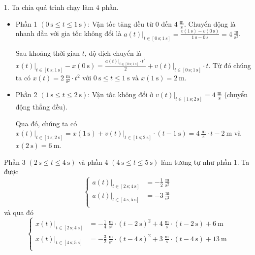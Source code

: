 \documentclass[a4paper, titlepage, openany]{book}
\newcounter{solution}
\numberwithin{equation}{chapter}
\begin{document}
\solution

1. Ta chia quá trình chạy làm $4$ phần.


\begin{itemize}
   \item Phần 1 $\left(0\ \text{s}\leq t \leq 1\ \text{s}\right)$: Vận tốc tăng đều từ $0$ đến $4\ \frac{\text{m}}{\text{s}}$. Chuyển động là nhanh dần với gia tốc không đổi là $\left.a(t)\right|_{t\in\left[0\ \text{s};1\ \text{s}\right]}=\frac{v(1\ \text{s})-v(0\ \text{s})}{1\ \text{s}-0\ \text{s}}=4\ \frac{\text{m}}{\text{s}^2}$.
   
Sau khoảng thời gian $t$, độ dịch chuyển là $\left.x(t)\right|_{t\in\left[0\ \text{s};1\ \text{s}\right]} - x(0\ \text{s}) = \frac{\left.a(t)\right|_{t\in\left[0\ \text{s};1\ \text{s}\right]}\cdot t^2}{2} + \left.v(t)\right|_{t\in\left[0\ \text{s};1\ \text{s}\right]}\cdot t$. Từ đó chúng ta có $x(t) = 2\ \frac{\text{m}}{\text{s}^2}\cdot t^2$ với $0\ \text{s}\leq t \leq 1\ \text{s}$ và $x(1\ \text{s}) = 2\ \text{m}$.
   
   \item Phần 2 $\left(1\ \text{s}\leq t \leq 2\ \text{s}\right)$: Vận tốc không đổi ở $\left.v(t)\right|_{t\in\left[1\ \text{s};2\ \text{s}\right]} = 4\ \frac{\text{m}}{\text{s}}$ (chuyển động thẳng đều). 
   
Qua đó, chúng ta có $\left.x(t)\right|_{t\in\left[1\ \text{s};2\ \text{s}\right]} = x(1\ \text{s}) + \left.v(t)\right|_{t\in\left[1\ \text{s};2\ \text{s}\right]}\cdot\left(t - 1\ \text{s}\right) = 4\ \frac{\text{m}}{\text{s}}\cdot t - 2\ \text{m}$ và $x(2\ \text{s}) = 6\ \text{m}$.
\end{itemize}

Phần 3 $\left(2\ \text{s}\leq t \leq 4\ \text{s}\right)$ và phần 4 $\left(4\ \text{s}\leq t \leq 5\ \text{s}\right)$ làm tương tự như phần 1. Ta được
\begin{equation*}
   \begin{cases}
     \left.a(t)\right|_{t\in\left[2\ \text{s};4\ \text{s}\right]} &= -\frac{1}{2}\ \frac{\text{m}}{\text{s}^2}\\
     \left.a(t)\right|_{t\in\left[4\ \text{s};5\ \text{s}\right]} &= -3\ \frac{\text{m}}{\text{s}^2}\\
   \end{cases}
\end{equation*}
và qua đó
\begin{equation*}
   \begin{cases}
     \left.x(t)\right|_{t\in\left[2\ \text{s};4\ \text{s}\right]} &= -\frac{1}{4}\ \frac{\text{m}}{\text{s}^2}\cdot\left(t - 2\ \text{s}\right)^2 + 4\ \frac{\text{m}}{\text{s}}\cdot \left(t - 2\ \text{s}\right) + 6\ \text{m}\\
     \left.x(t)\right|_{t\in\left[4\ \text{s};5\ \text{s}\right]} &= -\frac{3}{2}\ \frac{\text{m}}{\text{s}^2}\cdot\left(t - 4\ \text{s}\right)^2 + 3\ \frac{\text{m}}{\text{s}}\cdot \left(t - 4\ \text{s}\right) + 13\ \text{m}\\
   \end{cases}
\end{equation*}
\end{document}
